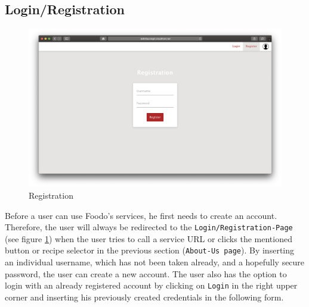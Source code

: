 \subsection*{Login/Registration}
\vspace{0.5em}
\begin{figure}[H]
	\captionsetup{justification=centering}
	\begin{center}
		\includegraphics[scale=0.23]{Ressourcen/img/screenshots/screenshotD.png}
		\vspace{-2em}
		\caption{Registration}
		\label{fig:registration}
	\end{center}
\end{figure}
Before a user can use Foodo’s services, he first needs to create an account. Therefore, the user will always be redirected to the \texttt{Login/Registration-Page} (see figure \ref{fig:registration}) when the user tries to call a service URL or clicks the mentioned button or recipe selector in the previous section (\texttt{About-Us page}). By inserting an individual username, which has not been taken already, and a hopefully secure password, the user can create a new account. The user also has the option to login with an already registered account by clicking on \texttt{Login} in the right upper corner and inserting his previously created credentials in the following form.
